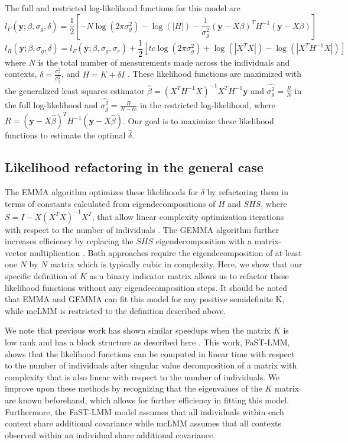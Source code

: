         The full and restricted log-likelihood functions for this model are
        \begin{equation}
            l_F(\mathbf{y}; \beta, \sigma_g, \delta) = \frac{1}{2}\left[-N\log{(2\pi\sigma^2_g)} - \log(|H|) - \frac{1}{\sigma^2_g}(\mathbf{y}-X\beta)^T H^{-1} (\mathbf{y}-X\beta)\right]
        \end{equation}
        \begin{equation}
            l_R(\mathbf{y}; \beta, \sigma_g, \delta) = l_F(\mathbf{y}; \beta, \sigma_g, \sigma_e) + \frac{1}{2}\left[tc\log(2\pi\sigma^2_g) + \log{(|X^TX|)} - \log{(|X^TH^{-1}X|)}\right]
        \end{equation}
        where $N$ is the total number of measurements made across the individuals and contexts, $\delta = \frac{\sigma^2_e}{\sigma^2_g}$, and $H = K + \delta I$  \cite{Welham}. These likelihood functions are maximized with the generalized least squares estimator $\hat{\beta} = (X^TH^{-1}X)^{-1}X^TH^{-1}\mathbf{y}$ and $\hat{\sigma^2_g} = \frac{R}{N}$ in the full log-likelihood and $\hat{\sigma^2_g} = \frac{R}{N-tc}$ in the restricted log-likelihood, where $R = (\mathbf{y}-X\hat{\beta})^TH^{-1}(\mathbf{y}-X\hat{\beta})$.  Our goal is to maximize these likelihood functions to estimate the optimal $\hat{\delta}$.
    
    \subsection{Likelihood refactoring in the general case}
        The EMMA algorithm optimizes these likelihoods for $\delta$ by refactoring them in terms of constants calculated from eigendecompositions of $H$ and $SHS$, where $S = I - X(X^TX)^{-1}X^T$, that allow linear complexity optimization iterations with respect to the number of individuals  \cite{Kang}. The GEMMA algorithm further increases efficiency by replacing the $SHS$ eigendecomposition with a matrix-vector multiplication \cite{Zhou}. Both approaches require the eigendecomposition of at least one $N$ by $N$ matrix which is typically cubic in complexity. Here, we show that our specific definition of $K$ as a binary indicator matrix allows us to refactor these likelihood functions without any eigendecomposition steps. It should be noted that EMMA and GEMMA can fit this model for any positive semidefinite K, while mcLMM is restricted to the definition described above. 
        
        We note that previous work has shown similar speedups when the matrix $K$ is low rank and has a block structure as described here \cite{Lippert2011}. This work, FaST-LMM, shows that the likelihood functions can be computed in linear time with respect to the number of individuals after singular value decomposition of a matrix with complexity that is also linear with respect to the number of individuals. We improve upon these methods by recognizing that the eigenvalues of the $K$ matrix are known beforehand, which allows for further efficiency in fitting this model. Furthermore, the FaST-LMM model assumes that all individuals within each context share additional covariance while mcLMM assumes that all contexts observed within an individual share additional covariance.
        
